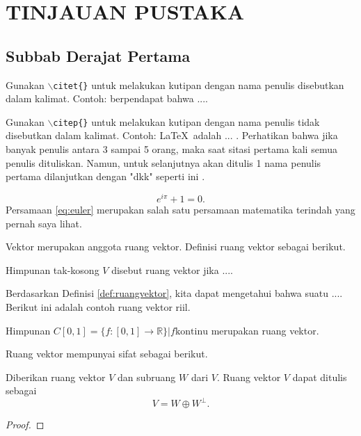 \chapter{TINJAUAN PUSTAKA}

\section{Subbab Derajat Pertama}
Gunakan \texttt{$\backslash$citet\{\}} untuk melakukan kutipan dengan nama penulis disebutkan dalam kalimat. Contoh: \citet{knuth:1984} berpendapat bahwa .... 

Gunakan \texttt{$\backslash$citep\{\}} untuk melakukan kutipan dengan nama penulis tidak disebutkan dalam kalimat. Contoh: \LaTeX \, adalah ... \citep{latex:companion}. Perhatikan bahwa jika banyak penulis antara 3 sampai 5 orang, maka saat sitasi pertama kali semua penulis dituliskan. Namun, untuk selanjutnya akan ditulis 1 nama penulis pertama
dilanjutkan dengan "dkk" seperti ini \citep{latex:companion}.

\begin{equation}
    e^{i\pi}+1=0.
    \label{eq:euler}
\end{equation}
Persamaan \eqref{eq:euler} merupakan salah satu persamaan matematika terindah yang pernah saya lihat.

Vektor merupakan anggota ruang vektor. Definisi ruang vektor sebagai berikut.
\begin{definition}
    Himpunan tak-kosong $V$ disebut ruang vektor jika ....
    \label{def:ruangvektor}
\end{definition}
Berdasarkan Definisi \ref{def:ruangvektor}, kita dapat mengetahui bahwa suatu ....
Berikut ini adalah contoh ruang vektor riil.
\begin{example}
    Himpunan $C[0,1] = \{f:[0,1] \to \mathbb{R}\} | f \mbox{kontinu}$ merupakan ruang vektor.
\end{example}

Ruang vektor mempunyai sifat sebagai berikut.
\begin{theorem}
    Diberikan ruang vektor $V$ dan subruang $W$ dari $V$. Ruang vektor $V$ dapat ditulis sebagai
	\begin{equation}
		V = W \oplus W^{\perp}. \label{eq:dekomposisiruangvektor}
	\end{equation}
    \label{thm:gramschmidt}
\end{theorem}

\begin{proof}
    \lipsum[1]
\end{proof}

